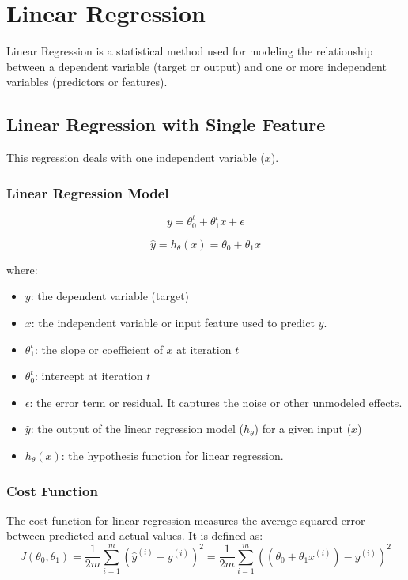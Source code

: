 \chapter{Linear Regression}

Linear Regression is a statistical method used for modeling the relationship between a dependent variable 
(target or output) and one or more independent variables (predictors or features).

\section{Linear Regression with Single Feature}
This regression deals with one independent variable ($x$).

\subsection{Linear Regression Model}

\begin{equation}
y = \theta_0^t + \theta_1^t x + \epsilon
\end{equation}

\begin{equation}
\hat{y} = h_\theta(x) = \theta_0 + \theta_1 x
\end{equation}


\noindent
where:
\begin{itemize}
    \item $y$:  the dependent variable (target)
    \item $x$: the independent variable or input feature used to predict \(y\).
    \item $\theta_1^t$:  the slope or coefficient of \(x\) at iteration \(t\)
    \item $\theta_0^t$: intercept at iteration $t$
    \item $\epsilon$: the error term or residual. It captures the noise or other unmodeled effects.
    \item $\hat{y}$: the output of the linear regression model ($h_\theta$) for a given input (\(x\))
    \item $h_\theta(x)$: the hypothesis function for linear regression.
\end{itemize}

\subsection{Cost Function}
The cost function for linear regression measures the average squared error between predicted and actual values. It is defined as:
\begin{equation}
J(\theta_0, \theta_1) = \frac{1}{2m} \sum_{i=1}^m \left( \hat{y}^{(i)} - y^{(i)} \right)^2
= \frac{1}{2m} \sum_{i=1}^m \left( (\theta_0 + \theta_1 x^{(i)}) - y^{(i)} \right)^2
\end{equation}

